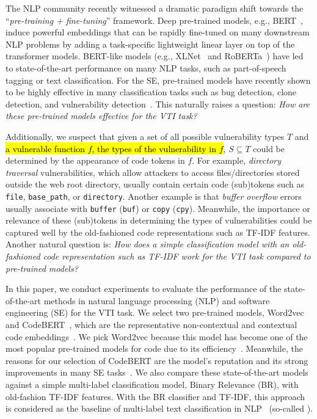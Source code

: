 The NLP community recently witnessed a dramatic paradigm shift towards the ``\textit{pre-training + fine-tuning}'' framework. Deep pre-trained models, e.g., BERT~\cite{bert}, induce powerful embeddings that can be rapidly fine-tuned on many downstream NLP problems by adding a task-specific lightweight linear layer on top of the transformer models. BERT-like models (e.g., XLNet~\cite{xlnet} and RoBERTa~\cite{roberta}) have led to state-of-the-art performance on many NLP tasks, such as part-of-speech tagging or text classification.
%
For the SE, pre-trained models have recently shown to be highly effective in many classification tasks such as bug detection, clone detection, and vulnerability detection~\cite{zhang2019novel,embedding_emse22,embedding_icse19,assessing_codebert, linevd,linevul}. This naturally raises a question: \textit{How are these pre-trained models effective for the VTI task?}

Additionally, we suspect that given a set of all possible vulnerability types $T$ and \hl{a vulnerable function $f$, the types of the vulnerability in $f$}, $S \subseteq T$ could be determined by the appearance of code tokens in $f$. 
%
For example, \textit{directory traversal} vulnerabilities, which allow attackers to access files/directories stored outside the web root directory, usually contain certain code (sub)tokens such as \texttt{file}, \texttt{base\_path}, or \texttt{directory}. Another example is that \textit{buffer overflow} errors usually associate with \texttt{buffer} (\texttt{buf}) or \texttt{copy} (\texttt{cpy}).
%
Meanwhile, the importance or relevance of these (sub)tokens in determining the types of vulnerabilities could be captured well by the old-fashioned code representations such as TF-IDF features. Another natural question is: \textit{How does a simple classification model with an old-fashioned code representation such as TF-IDF work for the VTI task compared to pre-trained models?}



In this paper, we conduct experiments to evaluate the performance of the state-of-the-art methods in natural language processing (NLP) and software engineering (SE) for the VTI task. We select two pre-trained models, Word2vec~\cite{word2vec_1} and CodeBERT~\cite{codebert}, which are the representative non-contextual and contextual code embeddings~\cite{ese_empirical}. We pick Word2vec because this model has become one of the most popular pre-trained models for code due to its efficiency~\cite{zhang2019novel,embedding_emse22}. Meanwhile, the reasons for our selection of CodeBERT are the model's reputation and its strong improvements in many SE tasks~\cite{assessing_codebert}. We also compare these state-of-the-art models against a simple multi-label classification model, Binary Relevance (BR), with old-fashion TF-IDF features. With the BR classifier and TF-IDF, this approach is considered as the baseline of multi-label text classification in NLP~\cite{brm} (so-called \base).

